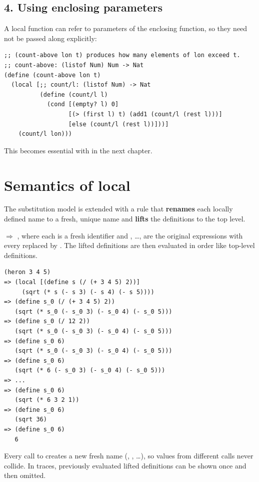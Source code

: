 \subsection{4. Using enclosing parameters}
A local function can refer to parameters of the enclosing function, so they
need not be passed along explicitly:
\begin{lstlisting}[style=racket]
;; (count-above lon t) produces how many elements of lon exceed t.
;; count-above: (listof Num) Num -> Nat
(define (count-above lon t)
  (local [;; count/l: (listof Num) -> Nat
          (define (count/l l)
            (cond [(empty? l) 0]
                  [(> (first l) t) (add1 (count/l (rest l)))]
                  [else (count/l (rest l))]))]
    (count/l lon)))
\end{lstlisting}
This becomes essential with  in the next chapter.

\section{Semantics of local}
The substitution model is extended with a rule that \textbf{renames} each
locally defined name to a fresh, unique name and \textbf{lifts} the
definitions to the top level.

\begin{important}
 $\Rightarrow$
, where each  is
a fresh identifier and , \ldots,  are the original
expressions with every  replaced by . The lifted
definitions are then evaluated in order like top-level definitions.
\end{important}

\begin{example}
\begin{lstlisting}[style=racket]
(heron 3 4 5)
=> (local [(define s (/ (+ 3 4 5) 2))]
     (sqrt (* s (- s 3) (- s 4) (- s 5))))
=> (define s_0 (/ (+ 3 4 5) 2))
   (sqrt (* s_0 (- s_0 3) (- s_0 4) (- s_0 5)))
=> (define s_0 (/ 12 2))
   (sqrt (* s_0 (- s_0 3) (- s_0 4) (- s_0 5)))
=> (define s_0 6)
   (sqrt (* s_0 (- s_0 3) (- s_0 4) (- s_0 5)))
=> (define s_0 6)
   (sqrt (* 6 (- s_0 3) (- s_0 4) (- s_0 5)))
=> ...
=> (define s_0 6)
   (sqrt (* 6 3 2 1))
=> (define s_0 6)
   (sqrt 36)
=> (define s_0 6)
   6
\end{lstlisting}
Every call to  creates a new fresh name (,
, \ldots), so values from different calls never collide. In
traces, previously evaluated lifted definitions can be shown once and then
omitted.
\end{example}

